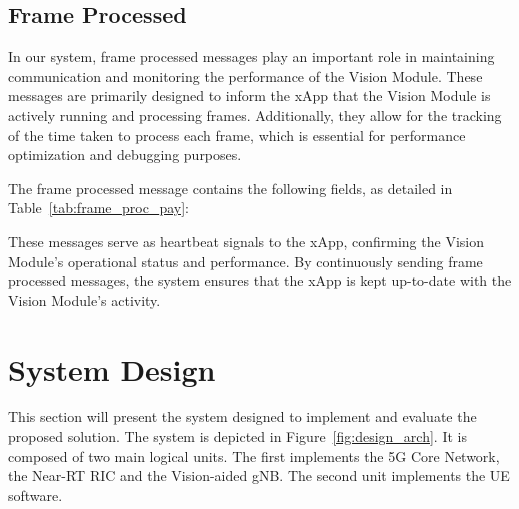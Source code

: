 \subsection{Frame Processed}\label{subsec:frame-processed}
In our system, frame processed messages play an important role in maintaining communication and monitoring the performance of the Vision Module.
These messages are primarily designed to inform the xApp that the Vision Module is actively running and processing frames.
Additionally, they allow for the tracking of the time taken to process each frame, which is essential for performance optimization and debugging purposes.

The frame processed message contains the following fields, as detailed in Table~\ref{tab:frame_proc_pay}:

\begin{table}[H]
    \caption{Components of the Frame Processed Message payload}
    \label{tab:frame_proc_pay}
    \centering
\end{table}

These messages serve as heartbeat signals to the xApp, confirming the Vision Module's operational status and performance.
By continuously sending frame processed messages, the system ensures that the xApp is kept up-to-date with the Vision Module's activity.


\section{System Design}\label{sec:design}

This section will present the system designed to implement and evaluate the proposed solution.
The system is depicted in Figure~\ref{fig:design_arch}.
It is composed of two main logical units.
The first implements the 5G Core Network, the Near-RT RIC and the Vision-aided gNB\@.
The second unit implements the UE software.


